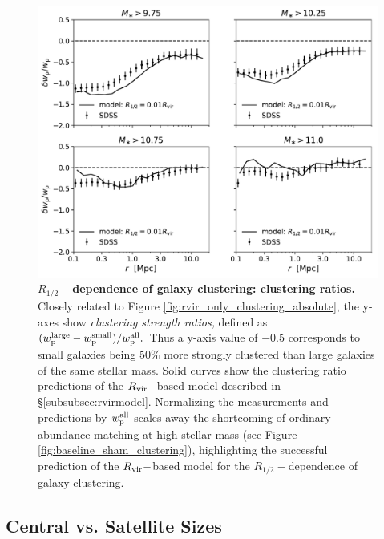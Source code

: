 \documentclass[usenatbib,usegraphicx,letterpaper]{mn2e}
\newcommand{\rhalf}{R_{1/2}}
\newcommand{\rvir}{R_{\rm vir}}
\begin{document}
\begin{figure}
\centering
\includegraphics[width=12cm]{FIGS/rvir_only_wp_ratios.pdf}
\caption{
{\bf $\rhalf-$dependence of galaxy clustering: clustering ratios.}
Closely related to Figure \ref{fig:rvir_only_clustering_absolute}, the y-axes show {\em clustering strength ratios,} defined as $(w_{\rm p}^{\rm large} - w_{\rm p}^{\rm small})/w_{\rm p}^{\rm all}.$ Thus a y-axis value of $-0.5$ corresponds to small galaxies being $50\%$ more strongly clustered than large galaxies of the same stellar mass. Solid curves show the clustering ratio predictions of the $\rvir-$based model described in \S\ref{subsubsec:rvirmodel}. Normalizing the measurements and predictions by $w_{\rm p}^{\rm all}$ scales away the shortcoming of ordinary abundance matching at high stellar mass (see Figure \ref{fig:baseline_sham_clustering}), highlighting the successful prediction of the $\rvir-$based model for the $\rhalf-$dependence of galaxy clustering.
}
\label{fig:clustering_ratio_upshot}
\end{figure}

\subsection{Central vs. Satellite Sizes}
\label{subsec:censat_sizes}
\end{document}
